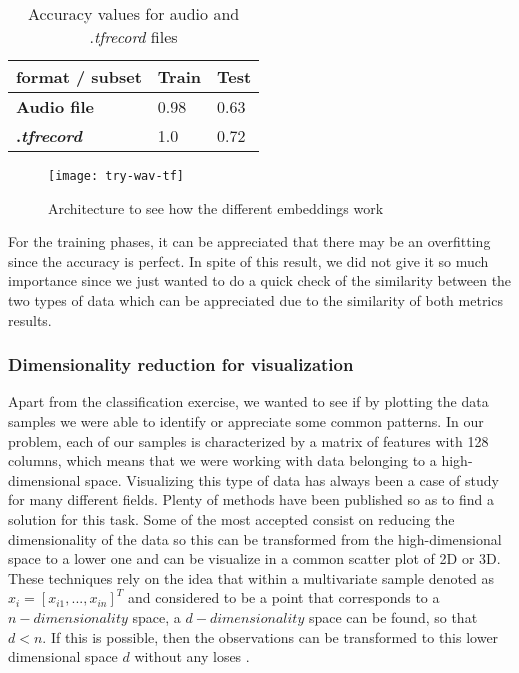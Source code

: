 	\begin{table}[h]
		\begin{center}
			\centering
			\begin{tabular}{|| m{7em} | m{7em} | m{7em} ||}
				\hline
				format / subset & \textbf{Train} & \textbf{Test} \\
				\hline\hline
				\textbf{Audio file} & 0.98 & 0.63 \\
				\hline
				\textbf{.\textit{tfrecord}} & 1.0 & 0.72 \\
				\hline
			\end{tabular}
		\end{center}
		\caption{Accuracy values for audio and .\textit{tfrecord} files}
		\label{table:5}
	\end{table}
	
	\begin{wrapfigure}[15]{R}{0.4\textwidth}
		\centering
		\captionsetup{justification=centering}
		\texttt{[image: try-wav-tf]}
		\caption{Architecture to see how the different embeddings work}
		\label{fig:mesh5}
	\end{wrapfigure}
	
	For the training phases, it can be appreciated that there may be an overfitting since the accuracy is perfect. In spite of this result, we did not give it so much importance since we just wanted to do a quick check of the similarity between the two types of data which can be appreciated due to the similarity of both metrics results.
	
\subsubsection{Dimensionality reduction for visualization}
\label{subsection:dimensionality-reduction-for-visualization}

	Apart from the classification exercise, we wanted to see if by plotting the data samples we were able to identify or appreciate some common patterns. In our problem, each of our samples is characterized by a matrix of features with 128 columns, which means that we were working with data belonging to a high-dimensional space. Visualizing this type of data has always been a case of study for many different fields. Plenty of methods have been published so as to find a solution for this task. Some of the most accepted consist on reducing the dimensionality of the data so this can be transformed from the high-dimensional space to a lower one and can be visualize in a common scatter plot of 2D or 3D. These techniques rely on the idea that within a multivariate sample denoted as $x_i = [x_{i1},..., x_{in}]^T$ and considered to be a point that corresponds to a $n-dimensionality$ space, a $d-dimensionality$ space can be found, so that $d < n$. %
	If this is possible, then the observations can be transformed to this lower dimensional space $d$ without any loses \cite{Kaski2011}. 
	
